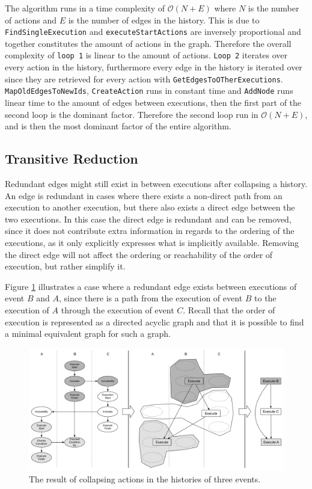 	\newpar The algorithm runs in a time complexity of $\mathcal{O}(N+E)$ where $N$ is the number of actions and $E$ is the number of edges in the history. This is due to \texttt{FindSingleExecution} and \texttt{executeStartActions} are inversely proportional and together constitutes the amount of actions in the graph. Therefore the overall complexity of \texttt{loop 1} is linear to the amount of actions. \texttt{Loop 2} iterates over every action in the history, furthermore every edge in the history is iterated over since they are retrieved for every action with \texttt{GetEdgesToOTherExecutions}. \texttt{MapOldEdgesToNewIds}, \texttt{CreateAction} runs in constant time and \texttt{AddNode} runs linear time to the amount of edges between executions, then the first part of the second loop is the dominant factor. Therefore the second loop run in $\mathcal{O}(N+E)$, and is then the most dominant factor of the entire algorithm.
	
	\subsection{Transitive Reduction}
	Redundant edges might still exist in between executions after collapsing a history. An edge is redundant in cases where there exists a non-direct path from an execution to another execution, but there also exists a direct edge between the two executions. In this case the direct edge is redundant and can be removed, since it does not contribute extra information in regards to the ordering of the executions, as it only explicitly expresses what is implicitly available. Removing the direct edge will not affect the ordering or reachability of the order of execution, but rather simplify it.
	
	\newpar Figure \ref{fig:orderofexecution:collapsing} illustrates a case where a redundant edge exists between executions of event $B$ and $A$, since there is a path from the execution of event $B$ to the execution of $A$ through the execution of event $C$. Recall that the order of execution is represented as a directed acyclic graph and that it is possible to find a minimal equivalent graph for such a graph.
	
	\begin{figure}[H]
		\centering
		\includegraphics[width=\textwidth]{5orderofexecution/images/transitive-example-collapse.pdf}
		\caption{The result of collapsing actions in the histories of three events.}
		\label{fig:orderofexecution:collapsing}
	\end{figure}
	
